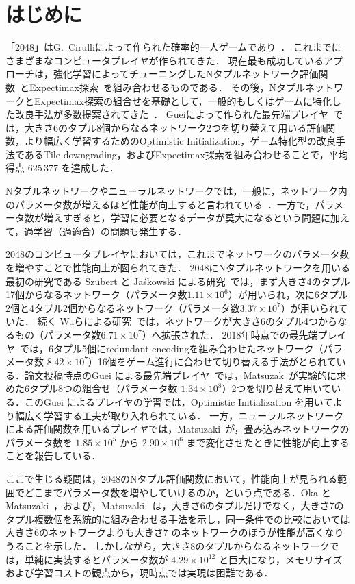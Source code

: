 \section{はじめに}
「2048」はG.~Cirulliによって作られた確率的一人ゲームであり~\cite{2048}．
これまでにさまざまなコンピュータプレイヤが作られてきた．
現在最も成功しているアプローチは，強化学習によってチューニングしたNタプルネットワーク評価関数~\cite{SzJa14}とExpectimax探索~\cite{YWHC16}を組み合わせるものである．
その後，NタプルネットワークとExpectimax探索の組合せを基礎として，一般的もしくはゲームに特化した改良手法が多数提案されてきた~\cite{YWHC16,Mats17,Jask17,GuCW22}．
Gueiによって作られた最先端プレイヤ~\cite{GuCW22}では，大きさ6のタプル8個からなるネットワーク2つを切り替えて用いる評価関数，より幅広く学習するためのOptimistic Initialization，ゲーム特化型の改良手法であるTile downgrading，およびExpectimax探索を組み合わせることで，平均得点 625\,377 を達成した．

Nタプルネットワークやニューラルネットワークでは，一般に，ネットワーク内のパラメータ数が増えるほど性能が向上すると言われている~\cite{kaplan2020scaling}．一方で，パラメータ数が増えすぎると，学習に必要となるデータが莫大になるという問題に加えて，過学習（過適合）の問題も発生する．

2048のコンピュータプレイヤにおいては，これまでネットワークのパラメータ数を増やすことで性能向上が図られてきた．
2048にNタプルネットワークを用いる最初の研究である Szubert と Ja\'{s}kowski による研究~\cite{SzJa14}では，まず大きさ4のタプル17個からなるネットワーク（パラメータ数$1.11\times 10^6$）が用いられ，次に6タプル2個と4タプル2個からなるネットワーク（パラメータ数$3.37\times 10^7$）が用いられていた．
続く Wuらによる研究~\cite{W???14}では，ネットワークが大きさ6のタプル4つからなるもの（パラメータ数$6.71\times 10^7$）へ拡張された．
2018年時点での最先端プレイヤ~\cite{Jask18}では，6タプル5個にredundant encodingを組み合わせたネットワーク（パラメータ数 $8.42\times 10^7$）16個をゲーム進行に合わせて切り替える手法がとられている．論文投稿時点のGuei による最先端プレイヤ~\cite{GuCW22}では，Matsuzak~\cite{Mats16}が実験的に求めた6タプル8つの組合せ（パラメータ数 $1.34\times 10^8$）2つを切り替えて用いている．このGuei によるプレイヤの学習では，Optimistic Initialization を用いてより幅広く学習する工夫が取り入れられている．
一方，ニューラルネットワークによる評価関数を用いるプレイヤでは，Matsuzaki~\cite{Mats19}が，畳み込みネットワークのパラメータ数を $1.85\times 10^5$ から $2.90\times 10^6$ まで変化させたときに性能が向上することを報告している．

ここで生じる疑問は，2048のNタプル評価関数において，性能向上が見られる範囲でどこまでパラメータ数を増やしていけるのか，という点である．Oka と Matsuzaki~\cite{OkMa}，および，Matsuzaki~\cite{Mats16} は，大きさ6のタプルだけでなく，大きさ7のタプル複数個を系統的に組み合わせる手法を示し，同一条件での比較においては大きさ6のネットワークよりも大きさ7 のネットワークのほうが性能が高くなりうることを示した．
しかしながら，大きさ8のタプルからなるネットワークでは，単純に実装するとパラメータ数が $4.29\times 10^{12}$ と巨大になり，メモリサイズおよび学習コストの観点から，現時点では実現は困難である．



